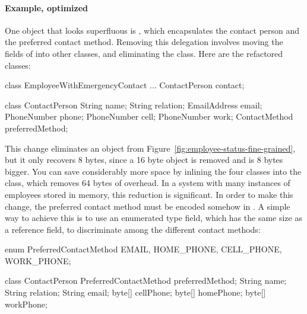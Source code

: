 \paragraph{Example, optimized} One object that looks superfluous is
, which encapsulates the contact person and the
preferred contact method. Removing this delegation involves moving the fields
of  into other classes, and eliminating the  class.
Here are the refactored classes:
\begin{shortlisting}
class EmployeeWithEmergencyContact {
    ...
    ContactPerson contact;
}
			
class ContactPerson {
    String name;
    String relation;
    EmailAddress email;
    PhoneNumber phone;
    PhoneNumber cell;
    PhoneNumber work;
    ContactMethod preferredMethod;
}
\end{shortlisting}
This change eliminates an object from
Figure~\ref{fig:employee-status-fine-grained}, but it only recovers 8 bytes,
since a 16 byte object is removed and  is 8 bytes bigger.
You can save considerably more space by inlining the four 
classes into the  class, which removes 64 bytes of
overhead. In a system with many instances of
employees stored in memory, this reduction is significant. In order to make this change,
the preferred contact method must be encoded somehow in .  A simple way to
achieve this is to use an enumerated type field, which has the same size as a
reference field, to discriminate among the different contact methods:

\begin{shortlisting} 
enum PreferredContactMethod {
    EMAIL, HOME_PHONE, CELL_PHONE, WORK_PHONE;
}
      
class ContactPerson {
    PreferredContactMethod preferredMethod;
    String name;
    String relation;
    String email;
    byte[] cellPhone;
    byte[] homePhone;
    byte[] workPhone;
}		
\end{shortlisting}


